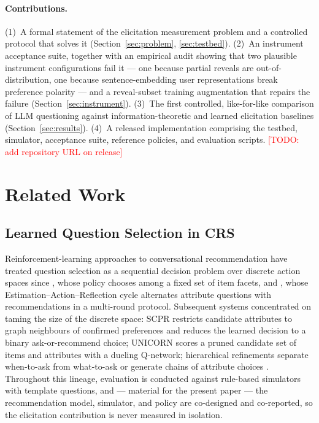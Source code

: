 \documentclass[11pt]{article}
\newcommand{\todo}[1]{\textcolor{red}{[TODO: #1]}}
\begin{document}
\paragraph{Contributions.}
(1)~A formal statement of the elicitation measurement problem and a
controlled protocol that solves it (Section~\ref{sec:problem},
\ref{sec:testbed}).
(2)~An instrument acceptance suite, together with an empirical audit showing
that two plausible instrument configurations fail it --- one because partial
reveals are out-of-distribution, one because sentence-embedding user
representations break preference polarity --- and a reveal-subset training
augmentation that repairs the failure (Section~\ref{sec:instrument}).
(3)~The first controlled, like-for-like comparison of LLM questioning
against information-theoretic and learned elicitation baselines
(Section~\ref{sec:results}).
(4)~A released implementation comprising the testbed, simulator, acceptance
suite, reference policies, and evaluation scripts.
\todo{add repository URL on release}

\section{Related Work}
\label{sec:related}

\subsection{Learned Question Selection in CRS}

Reinforcement-learning approaches to conversational recommendation have
treated question selection as a sequential decision problem over discrete
action spaces since \citet{sun2018conversational}, whose policy chooses
among a fixed set of item facets, and \citet{lei2020estimation}, whose
Estimation--Action--Reflection cycle alternates attribute questions with
recommendations in a multi-round protocol. Subsequent systems concentrated
on taming the size of the discrete space: SCPR \citep{lei2020interactive}
restricts candidate attributes to graph neighbours of confirmed preferences
and reduces the learned decision to a binary ask-or-recommend choice;
UNICORN \citep{deng2021unified} scores a pruned candidate set of items and
attributes with a dueling Q-network; hierarchical refinements separate
when-to-ask from what-to-ask \citep{zhao2023hierarchical} or generate
chains of attribute choices \citep{fan2024chain}. Throughout this lineage,
evaluation is conducted against rule-based simulators with template
questions, and --- material for the present paper --- the recommendation
model, simulator, and policy are co-designed and co-reported, so the
elicitation contribution is never measured in isolation.
\end{document}
